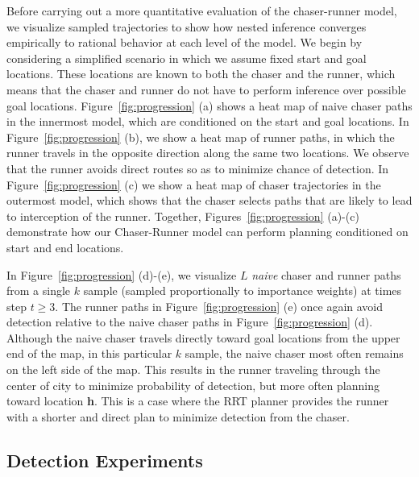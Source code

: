 \documentclass[twoside]{article}
\begin{document}
Before carrying out a more quantitative evaluation of the chaser-runner model, we visualize sampled trajectories to show how nested inference converges empirically to rational behavior at each level of the model. 
We begin by considering a simplified scenario in which we assume fixed start and goal locations. These locations are known to both the chaser and the runner, which means that the chaser and runner do not have to perform inference over possible goal locations.
Figure~\ref{fig:progression} (a) shows a heat map of naive chaser paths in the innermost model, which are conditioned on the start and goal locations. In Figure~\ref{fig:progression} (b), we show a heat map of runner paths, in which the runner travels in the opposite direction along the same two locations. We observe that the runner avoids direct routes so as to minimize chance of detection. In Figure~\ref{fig:progression} (c) we show a heat map of chaser trajectories in the outermost model, which shows that the chaser selects paths that are likely to lead to interception of the runner. Together, Figures~\ref{fig:progression} (a)-(c) demonstrate how our Chaser-Runner model can perform planning conditioned on start and end locations.

In Figure~\ref{fig:progression} (d)-(e), we visualize $L$ \textit{naive} chaser and runner paths from a single $k$ sample (sampled proportionally to importance weights) at times step $t\ge3$. 
The runner paths in Figure~\ref{fig:progression} (e) once again avoid detection relative to the naive chaser paths in Figure~\ref{fig:progression} (d). Although the naive chaser travels directly toward goal locations from the upper end of the map, in this particular $k$ sample, the naive chaser most often remains on the left side of the map. This results in the runner traveling through the center of city to minimize probability of detection, but more often planning toward location \textbf{h}.  This is a case where the RRT planner provides the runner with  a shorter and direct plan to minimize detection from the chaser. 







\vspace{-0.25em}
\subsection{Detection Experiments}
\vspace{-0.25em}
\end{document}
